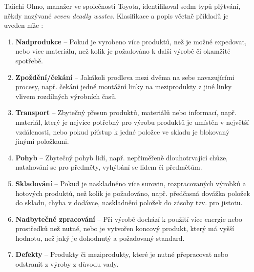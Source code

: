 Taiichi Ohno, manažer ve společnosti Toyota, identifikoval sedm typů plýtvání, někdy nazývané \emph{seven deadly wastes}. Klasifikace a popis včetně příkladů je uveden níže \cite{bib:seven}:
\begin{enumerate}
    \item \textbf{Nadprodukce} -- Pokud je vyrobeno více produktů, než je možné expedovat, nebo více materiálu, než kolik je požadováno k další výrobě či okamžité spotřebě. 
    \item \textbf{Zpoždění/čekání} -- Jakákoli prodleva mezi dvěma na sebe navazujícími procesy, např. čekání jedné montážní linky na meziprodukty z jiné linky vlivem rozdílných výrobních časů.
    \item \textbf{Transport} -- Zbytečný přesun produktů, materiálů nebo informací, např. materiál, který je nejvíce potřebný pro výrobu produktů je umístěn v největší vzdálenosti, nebo pokud přístup k jedné položce ve skladu je blokovaný jinými položkami.
    \item \textbf{Pohyb} -- Zbytečný pohyb lidí, např. nepřiměřeně dlouhotrvající chůze, natahování se pro předměty, vyhýbání se lidem či předmětům.
    \item \textbf{Skladování} -- Pokud je naskladněno více surovin, rozpracovaných výrobků a hotových produktů, než kolik je požadováno, např. předčasná dovážka položek do skladu, chyba v dodávce, naskladnění položek do zásoby tzv. pro jistotu.
    \item \textbf{Nadbytečné zpracování} -- Při výrobě dochází k použití více energie nebo prostředků než nutné, nebo je vytvořen koncový produkt, který má vyšší hodnotu, než jaký je dohodnutý a požadovaný standard. 
    \item \textbf{Defekty} -- Produkty či meziprodukty, které je nutné přepracovat nebo odstranit z výroby z důvodu vady.
\end{enumerate}

